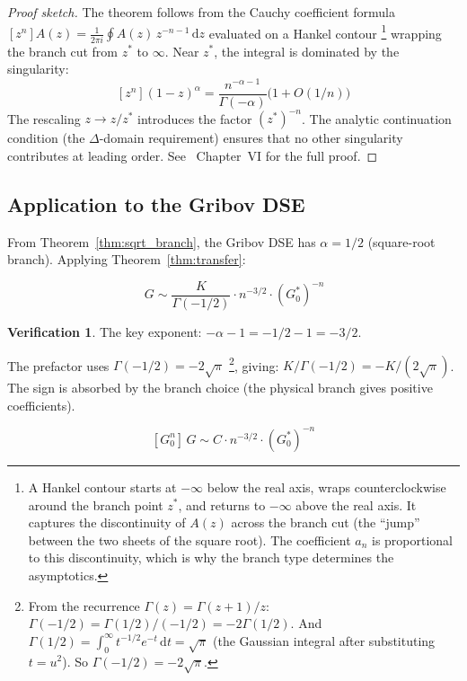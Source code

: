 \documentclass[11pt,a4paper]{article}
\theoremstyle{definition}
\newtheorem*{verification}{Verification}
\newcommand{\dd}{\mathrm{d}}
\begin{document}
\begin{proof}[Proof sketch]
The theorem follows from the Cauchy coefficient formula
$[z^n] A(z) = \frac{1}{2\pi i} \oint A(z)\, z^{-n-1}\, \dd z$
evaluated on a Hankel contour%
\footnote{A Hankel contour starts at $-\infty$ below the real axis,
wraps counterclockwise around the branch point $z^*$, and returns to
$-\infty$ above the real axis. It captures the discontinuity of $A(z)$
across the branch cut (the ``jump'' between the two sheets of the
square root). The coefficient $a_n$ is proportional to this discontinuity,
which is why the branch type determines the asymptotics.}
wrapping the branch cut from $z^*$ to $\infty$. Near $z^*$, the integral is dominated by the singularity:
\[
[z^n](1 - z)^\alpha = \frac{n^{-\alpha-1}}{\Gamma(-\alpha)}\bigl(1 + O(1/n)\bigr)
\]
The rescaling $z \to z/z^*$ introduces the factor $(z^*)^{-n}$.
The analytic continuation condition (the $\Delta$-domain requirement)
ensures that no other singularity contributes at leading order.
See~\cite{flajolet2009} Chapter~VI for the full proof.
\end{proof}

\subsection{Application to the Gribov DSE}

From Theorem~\ref{thm:sqrt_branch}, the Gribov DSE has $\alpha = 1/2$
(square-root branch). Applying Theorem~\ref{thm:transfer}:

\begin{equation}
[G_0^n]\, G \sim \frac{K}{\Gamma(-1/2)} \cdot n^{-3/2} \cdot (G_0^*)^{-n}
\label{eq:gribov_coeffs}
\end{equation}

\begin{verification}
The key exponent: $-\alpha - 1 = -1/2 - 1 = -3/2$. \checkmark

The prefactor uses $\Gamma(-1/2) = -2\sqrt{\pi}$%
\footnote{From the recurrence $\Gamma(z) = \Gamma(z{+}1)/z$:
$\Gamma(-1/2) = \Gamma(1/2)/(-1/2) = -2\Gamma(1/2)$. And
$\Gamma(1/2) = \int_0^\infty t^{-1/2}e^{-t}\,\dd t = \sqrt{\pi}$
(the Gaussian integral after substituting $t = u^2$).
So $\Gamma(-1/2) = -2\sqrt{\pi}$.}, giving:
$K/\Gamma(-1/2) = -K/(2\sqrt{\pi})$.
The sign is absorbed by the branch choice (the physical branch gives
positive coefficients).
\end{verification}

\begin{equation}
\boxed{[G_0^n]\, G \sim C \cdot n^{-3/2} \cdot (G_0^*)^{-n}}
\label{eq:coeff_asymptotics}
\end{equation}
\end{document}
